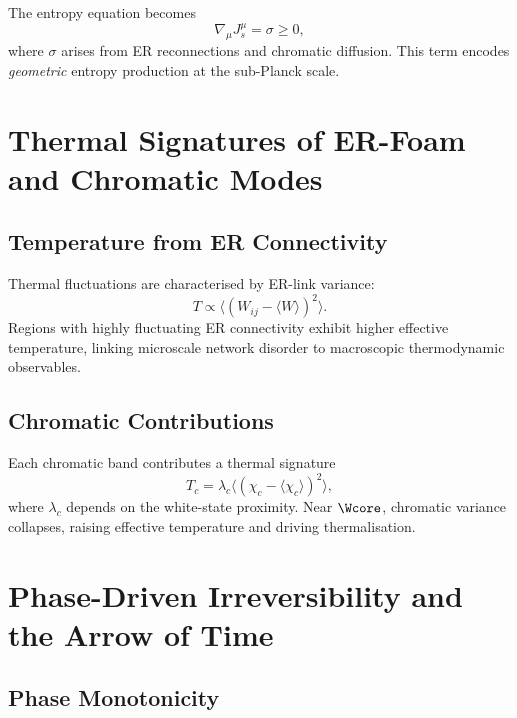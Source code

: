 The entropy equation becomes
\[
\nabla_\mu J^\mu_s = \sigma \ge 0,
\]
where $\sigma$ arises from ER reconnections and chromatic diffusion.
This term encodes \emph{geometric} entropy production at the sub-Planck scale.


\chapter{Thermal Signatures of ER-Foam and Chromatic Modes}

\section{Temperature from ER Connectivity}

Thermal fluctuations are characterised by ER-link variance:
\[
T \propto \langle (W_{ij} - \langle W\rangle)^2 \rangle.
\]
Regions with highly fluctuating ER connectivity exhibit higher effective temperature, linking microscale network disorder to macroscopic thermodynamic observables.

\section{Chromatic Contributions}

Each chromatic band contributes a thermal signature
\[
T_c = \lambda_c \langle (\chi_c - \langle\chi_c\rangle)^2\rangle,
\]
where $\lambda_c$ depends on the white-state proximity.
Near $\Wcore$, chromatic variance collapses, raising effective temperature and driving thermalisation.


\chapter{Phase-Driven Irreversibility and the Arrow of Time}

\section{Phase Monotonicity}

